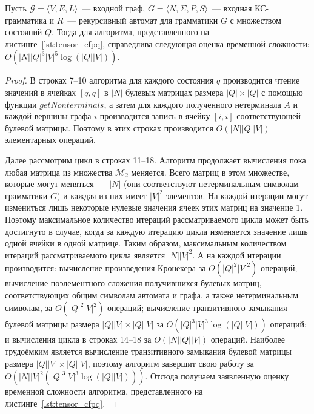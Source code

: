\begin{theorem}\label{thm:time_tns}
	Пусть $\mathcal{G} = \langle V, E, L \rangle$~--- входной граф, $G =\langle N, \Sigma, P, S \rangle$~--- входная КС-грамматика и $R$~--- рекурсивный автомат для грамматики $G$ с множеством состояний $Q$. Тогда для алгоритма, представленного на листинге~\ref{lst:tensor_cfpq}, справедлива следующая оценка временной сложности: $O(|N||Q|^3|V|^5 \log (|Q||V|))$.
\end{theorem}
\begin{proof}
В строках 7--10 алгоритма для каждого состояния $q$ производится чтение значений в ячейках $[q, q]$ в $|N|$ булевых матрицах размера $|Q| \times |Q|$ с помощью функции $\textit{getNonterminals}$, а затем для каждого полученного нетерминала $A$ и каждой вершины графа $i$ производится запись в ячейку $[i, i]$ соответствующей булевой матрицы. Поэтому в этих строках производится $O(|N||Q||V|)$ элементарных операций. 

Далее рассмотрим цикл в строках 11--18. Алгоритм продолжает вычисления пока любая матрица из множества $\mathcal{M}_2$ меняется. Всего матриц в этом множестве, которые могут меняться~--- $|N|$ (они соответствуют нетерминальным символам грамматики $G$) и каждая из них имеет $|V|^2$ элементов. На каждой итерации могут измениться лишь некоторые нулевые значения ячеек этих матриц на значение 1. Поэтому максимальное количество итераций рассматриваемого цикла может быть достигнуто в случае, когда за каждую итерацию цикла изменяется значение лишь одной ячейки в одной матрице. Таким образом, максимальным количеством итераций рассматриваемого цикла является $|N||V|^2$. А на каждой итерации производится: вычисление произведения Кронекера за $O(|Q|^2|V|^2)$ операций; вычисление поэлементного сложения получившихся булевых матриц, соответствующих общим символам автомата и графа, а также нетерминальным символам, за $O(|Q|^2|V|^2)$ операций; вычисление транзитивного замыкания булевой матрицы размера $|Q||V| \times |Q||V|$ за $O(|Q|^3|V|^3 \log (|Q||V|))$ операций; и вычисления цикла в строках 14--18 за $O(|N||Q||V|)$ операций. Наиболее трудоёмким является вычисление транзитивного замыкания булевой матрицы размера $|Q||V| \times |Q||V|$, поэтому алгоритм завершит свою работу за $O(|N||V|^2 (|Q|^3|V|^3 \log (|Q||V|)))$. Отсюда получаем заявленную оценку временной сложности алгоритма, представленного на листинге~\ref{lst:tensor_cfpq}.
\end{proof}

